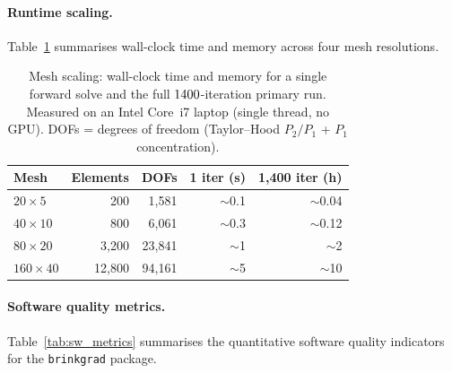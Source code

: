 \paragraph{Runtime scaling.}
Table~\ref{tab:scaling} summarises wall-clock time and
memory across four mesh resolutions.

\begin{table}[h]
\centering\small
\caption{Mesh scaling: wall-clock time and memory for a single forward solve
         and the full $1400$-iteration primary run.
         Measured on an Intel Core~i7 laptop (single thread, no GPU).
         DOFs = degrees of freedom (Taylor--Hood $P_2/P_1$ + $P_1$ concentration).}
\label{tab:scaling}
\begin{tabular}{@{}lrrrr@{}}
\toprule
\textbf{Mesh} & \textbf{Elements} & \textbf{DOFs} &
\textbf{1 iter (s)} & \textbf{1{,}400 iter (h)} \\
\midrule
$20\times5$   &   200 &   1{,}581 & $\sim$0.1 & $\sim$0.04 \\
$40\times10$  &   800 &   6{,}061 & $\sim$0.3 & $\sim$0.12 \\
$80\times20$  & 3{,}200 &  23{,}841 & $\sim$1   & $\sim$2    \\
$160\times40$ & 12{,}800 & 94{,}161 & $\sim$5   & $\sim$10   \\
\bottomrule
\end{tabular}
\end{table}

\paragraph{Software quality metrics.}
Table~\ref{tab:sw_metrics} summarises the quantitative
software quality indicators for the \texttt{brinkgrad} package.

